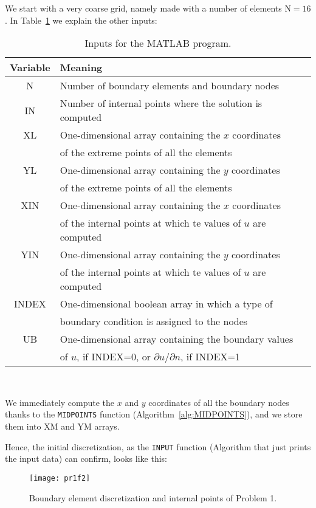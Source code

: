 We start with a very coarse grid, namely made with a number of elements $\text{N}=16$. In Table~\ref{table:2pr1t1} we explain the other inputs:
\begin{table}[H]
    \centering 
    \begin{tabular}{cl}
    \hline
    \rowcolor{bluepoli!40} %
    Variable & Meaning  \\
    \hline
    N & Number of boundary elements and boundary nodes \\
    IN & Number of internal points where the solution is computed \\
    XL & One-dimensional array containing the $x$ coordinates \\
    & of the extreme points of all the elements \\
    YL & One-dimensional array containing the $y$ coordinates \\
    & of the extreme points of all the elements \\
    XIN & One-dimensional array containing the $x$ coordinates \\
    & of the internal points at which te values of $u$ are computed \\
    YIN & One-dimensional array containing the $y$ coordinates \\
    & of the internal points at which te values of $u$ are computed \\
    INDEX & One-dimensional boolean array in which a type of \\
    & boundary condition is assigned to the nodes \\
    UB & One-dimensional array containing the boundary values \\
    & of $u$, if INDEX=0, or $\partial u / \partial n$, if INDEX=1 \\
    \hline
    \end{tabular}
    \\[10pt]
    \caption{Inputs for the MATLAB program.}
    \label{table:2pr1t1}
\end{table}

We immediately compute the $x$ and $y$ coordinates of all the boundary nodes thanks to the \texttt{MIDPOINTS} function (Algorithm~\ref{alg:MIDPOINTS}), and we store them into XM and YM arrays.

Hence, the initial discretization, as the \texttt{INPUT} function (Algorithm that just prints the input data) can confirm, looks like this:
\begin{figure}[H]
    \centering
    \texttt{[image: pr1f2]}
    \caption{Boundary element discretization and internal points of Problem 1.}
    \label{fig:2pr1f1}
\end{figure}

